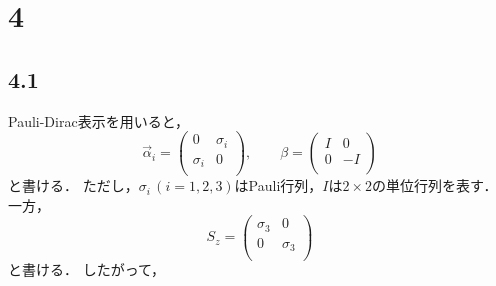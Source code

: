 \section*{4}
\subsection*{4.1}
Pauli-Dirac表示を用いると，
\begin{equation}
  \vec{\alpha}_i = 
  \begin{pmatrix}
    0 & \sigma_i \\
    \sigma_i & 0 \\
  \end{pmatrix}
  , \qquad
  \beta = 
  \begin{pmatrix}
    I & 0 \\
    0 & -I \\
  \end{pmatrix}
\end{equation}
と書ける．
ただし，$\sigma_i\,(i=1,2,3)$はPauli行列，$I$は$2\times 2$の単位行列を表す．
一方，
\begin{equation}
  S_z = 
  \begin{pmatrix}
    \sigma_3 & 0 \\
    0 & \sigma_3 \\
  \end{pmatrix}
\end{equation}
と書ける．
したがって，
